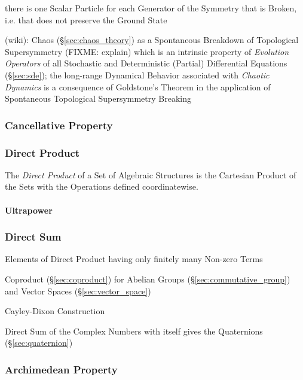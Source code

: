 there is one Scalar Particle for each Generator of the Symmetry that is Broken,
i.e. that does not preserve the Ground State

(wiki): Chaos (\S\ref{sec:chaos_theory}) as a Spontaneous Breakdown of
Topological Supersymmetry (FIXME: explain) which is an intrinsic property of
\emph{Evolution Operators} of all Stochastic and Deterministic (Partial)
Differential Equations (\S\ref{sec:sde}); the long-range Dynamical Behavior
associated with \emph{Chaotic Dynamics} is a consequence of Goldstone's Theorem
in the application of Spontaneous Topological Supersymmetry Breaking



\subsubsection{Cancellative Property}\label{sec:cancellative_property}

\subsubsection{Direct Product}\label{sec:direct_product}

The \emph{Direct Product} of a Set of Algebraic Structures is the Cartesian
Product of the Sets with the Operations defined coordinatewise.



\paragraph{Ultrapower}\label{sec:ultrapower}\hfill



\subsubsection{Direct Sum}\label{sec:direct_sum}

Elements of Direct Product having only finitely many Non-zero Terms

Coproduct (\S\ref{sec:coproduct}) for Abelian Groups
(\S\ref{sec:commutative_group}) and Vector Spaces (\S\ref{sec:vector_space})

Cayley-Dixon Construction

Direct Sum of the Complex Numbers with itself gives the Quaternions
(\S\ref{sec:quaternion})



\subsubsection{Archimedean Property}\label{sec:archimedean_property}

